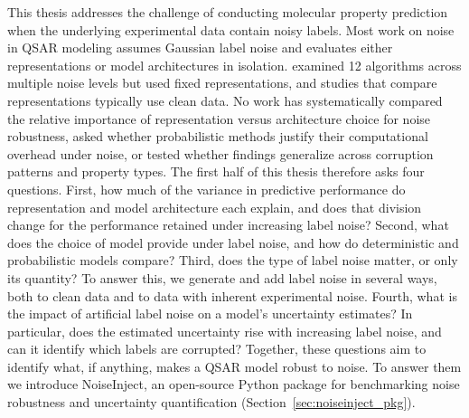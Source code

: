 This thesis addresses the challenge of conducting molecular property prediction when the underlying experimental data contain noisy labels. Most work on noise in QSAR modeling assumes Gaussian label noise and evaluates either representations or model architectures in isolation. \citet{Cortes2015} examined 12 algorithms across multiple noise levels but used fixed representations, and studies that compare representations typically use clean data. No work has systematically compared the relative importance of representation versus architecture choice for noise robustness, asked whether probabilistic methods justify their computational overhead under noise, or tested whether findings generalize across corruption patterns and property types. The first half of this thesis therefore asks four questions.\label{sec:intro:questions} First, how much of the variance in predictive performance do representation and model architecture each explain, and does that division change for the performance retained under increasing label noise? Second, what does the choice of model provide under label noise, and how do deterministic and probabilistic models compare? Third, does the type of label noise matter, or only its quantity? To answer this, we generate and add label noise in several ways, both to clean data and to data with inherent experimental noise. Fourth, what is the impact of artificial label noise on a model's uncertainty estimates? In particular, does the estimated uncertainty rise with increasing label noise, and can it identify which labels are corrupted? Together, these questions aim to identify what, if anything, makes a QSAR model robust to noise. To answer them we introduce NoiseInject, an open-source Python package for benchmarking noise robustness and uncertainty quantification (Section~\ref{sec:noiseinject_pkg}).

